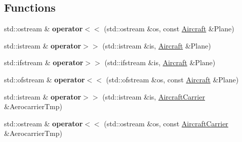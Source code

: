 \subsection*{Functions}
\begin{DoxyCompactItemize}
\item 
\mbox{\label{namespace_aircraft_carrier_group_a7086b798964cb013d658074468fbf7b9}} 
std\+::ostream \& {\bfseries operator$<$$<$} (std\+::ostream \&os, const \mbox{\hyperlink{class_aircraft_carrier_group_1_1_aircraft}{Aircraft}} \&Plane)
\item 
\mbox{\label{namespace_aircraft_carrier_group_acb10365ad0985a5893d722e262903059}} 
std\+::istream \& {\bfseries operator$>$$>$} (std\+::istream \&is, \mbox{\hyperlink{class_aircraft_carrier_group_1_1_aircraft}{Aircraft}} \&Plane)
\item 
\mbox{\label{namespace_aircraft_carrier_group_a22ed3a3a46c0fd896e01fd071ad3b9e9}} 
std\+::ifstream \& {\bfseries operator$>$$>$} (std\+::ifstream \&is, \mbox{\hyperlink{class_aircraft_carrier_group_1_1_aircraft}{Aircraft}} \&Plane)
\item 
\mbox{\label{namespace_aircraft_carrier_group_a69e1ec2fd6a45ba545ec6ff0f3e0b286}} 
std\+::ofstream \& {\bfseries operator$<$$<$} (std\+::ofstream \&os, const \mbox{\hyperlink{class_aircraft_carrier_group_1_1_aircraft}{Aircraft}} \&Plane)
\item 
\mbox{\label{namespace_aircraft_carrier_group_aed5832cc1645fd6462a85d7a822a9b4e}} 
std\+::istream \& {\bfseries operator$>$$>$} (std\+::istream \&is, \mbox{\hyperlink{class_aircraft_carrier_group_1_1_aircraft_carrier}{Aircraft\+Carrier}} \&Aerocarrier\+Tmp)
\item 
\mbox{\label{namespace_aircraft_carrier_group_af4d1dd1af14f671fd8fa30824a279938}} 
std\+::ostream \& {\bfseries operator$<$$<$} (std\+::ostream \&os, const \mbox{\hyperlink{class_aircraft_carrier_group_1_1_aircraft_carrier}{Aircraft\+Carrier}} \&Aerocarrier\+Tmp)
\item 
\mbox{\label{namespace_aircraft_carrier_group_a2978940c703df25a3a5a452389495b16}} 

\end{DoxyCompactItemize}
